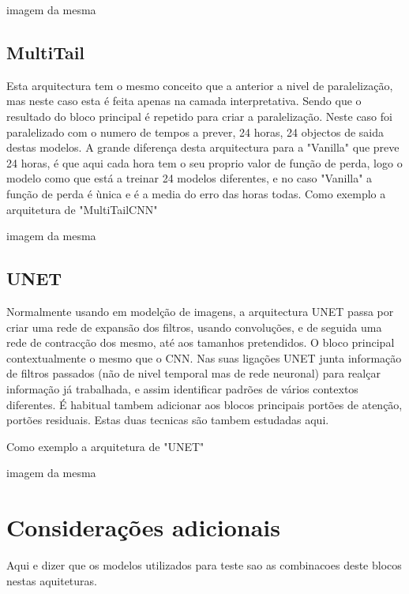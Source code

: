imagem da mesma

\subsection{MultiTail \label{se:dados_tratamento}}

Esta arquitectura tem o mesmo conceito que a anterior a nivel de paralelização, mas neste caso esta é feita apenas na camada interpretativa. Sendo que o resultado do bloco principal é repetido para criar a paralelização.
Neste caso foi paralelizado com o numero de tempos a prever, 24 horas, 24 objectos de saida destas modelos. 
A grande diferença desta arquitectura para a "Vanilla" que preve 24 horas, é que aqui cada hora tem o seu proprio valor de função de perda, logo o modelo como que está a treinar 24 modelos diferentes, e no caso "Vanilla" a função de perda é ùnica e é a media do erro das horas todas.
Como exemplo a arquitetura de "MultiTailCNN"

imagem da mesma

\subsection{UNET  \label{se:dados_tratamento}}

Normalmente usando em modelção de imagens, a arquitectura UNET passa por criar uma rede de expansão dos filtros, usando convoluções, e de seguida uma rede de contracção dos mesmo, até aos tamanhos pretendidos.
O bloco principal contextualmente o mesmo que o CNN.
Nas suas ligações UNET junta informação de filtros passados (não de nivel temporal mas de rede neuronal) para realçar informação já trabalhada, e assim identificar padrões de vários contextos diferentes.
É habitual tambem adicionar aos blocos principais portões de atenção, portões residuais. Estas duas tecnicas são tambem estudadas aqui.

Como exemplo a arquitetura de "UNET"

imagem da mesma


\section{Considerações adicionais  \label{se:dados_plus}}

Aqui e dizer que os modelos utilizados para teste sao as combinacoes deste blocos nestas aquiteturas.

